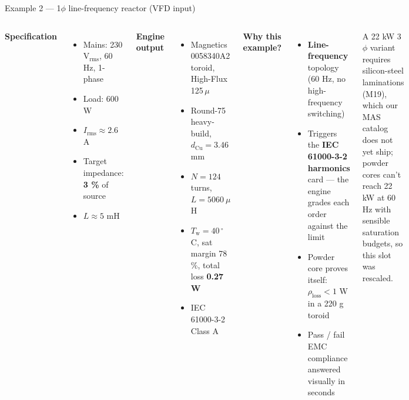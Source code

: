 \documentclass[11pt, aspectratio=169]{beamer}
\begin{document}
\begin{frame}{Example 2 --- 1$\phi$ line-frequency reactor (VFD input)}
  \begin{columns}[T,onlytextwidth]
    \textbf{Specification}
    \begin{itemize}
      \item Mains: 230 V$_\text{rms}$, 60 Hz, 1-phase
      \item Load: 600 W
      \item $I_\text{rms} \approx 2.6$ A
      \item Target impedance: \textbf{3 \%} of source
      \item $L \approx 5$ mH
    \end{itemize}

    \textbf{Engine output}
    \begin{itemize}
      \item Magnetics 0058340A2 toroid, High-Flux 125\,$\mu$
      \item Round-75 heavy-build, $d_\text{Cu} = 3.46$ mm
      \item $N = 124$ turns, $L = 5060~\mu$H
      \item $T_\text{w} = 40$\,$^\circ$C, sat margin 78\,\%,
            total loss \textbf{0.27 W}
      \item IEC 61000-3-2 Class A
    \end{itemize}

    \textbf{Why this example?}
    \begin{itemize}
      \item \textbf{Line-frequency} topology (60 Hz, no
            high-frequency switching)
      \item Triggers the \textbf{IEC 61000-3-2 harmonics}
            card --- the engine grades each order against
            the limit
      \item Powder core proves itself: $\rho_\text{loss}
            < 1$ W in a 220 g toroid
      \item Pass / fail EMC compliance answered visually in
            seconds
    \end{itemize}

    \medskip
    \footnotesize\color{md-muted}
    A 22 kW 3$\phi$ variant requires silicon-steel
    laminations (M19), which our MAS catalog does not yet
    ship; powder cores can't reach 22 kW at 60 Hz with
    sensible saturation budgets, so this slot was rescaled.
  \end{columns}
\end{frame}
\end{document}
